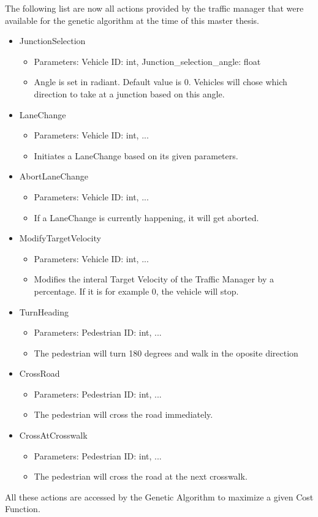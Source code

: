 The following list are now all actions provided by the traffic manager that were available for the genetic algorithm at the time of this master thesis.
\begin{itemize}
	\item JunctionSelection
		\begin{itemize}
			\item Parameters: Vehicle ID: int, Junction\_selection\_angle: float
			\item Angle is set in radiant. Default value is 0. Vehicles will chose which direction to take at a junction based on this angle.
		\end{itemize}
	\item LaneChange
		\begin{itemize}
			\item Parameters: Vehicle ID: int, ...
			\item Initiates a LaneChange based on its given parameters.
		\end{itemize}
	\item AbortLaneChange
		\begin{itemize}
			\item Parameters: Vehicle ID: int, ...
			\item If a LaneChange is currently happening, it will get aborted.
		\end{itemize}
	\item ModifyTargetVelocity
		\begin{itemize}
			\item Parameters: Vehicle ID: int, ...
			\item Modifies the interal Target Velocity of the Traffic Manager by a percentage. If it is for example 0, the vehicle will stop.
		\end{itemize}
	\item TurnHeading
		\begin{itemize}
			\item Parameters: Pedestrian ID: int, ...
			\item The pedestrian will turn 180 degrees and walk in the oposite direction
		\end{itemize}
	\item CrossRoad
		\begin{itemize}
			\item Parameters: Pedestrian ID: int, ...
			\item The pedestrian will cross the road immediately.
		\end{itemize}
	\item CrossAtCrosswalk
		\begin{itemize}
			\item Parameters: Pedestrian ID: int, ...
			\item The pedestrian will cross the road at the next crosswalk.
		\end{itemize}
\end{itemize}
All these actions are accessed by the Genetic Algorithm to maximize a given Cost Function.

